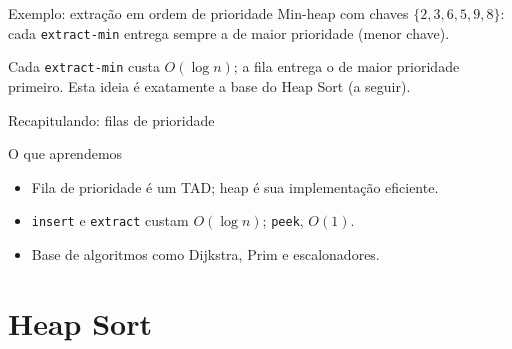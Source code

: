 \documentclass[aspectratio=169]{beamer}
\begin{document}
\begin{frame}{Exemplo: extração em ordem de prioridade}
  Min-heap com chaves $\{2,3,6,5,9,8\}$: cada \texttt{extract-min} entrega
  sempre a de maior prioridade (menor chave).
  \begin{center}
  \end{center}
  Cada \texttt{extract-min} custa $O(\log n)$; a fila entrega o de maior
  prioridade primeiro.
  \vfill
  {\footnotesize\color{UFSGray} Esta ideia é exatamente a base do Heap Sort
  (a seguir).}
\end{frame}

\begin{frame}{Recapitulando: filas de prioridade}
  \begin{block}{O que aprendemos}
    \begin{itemize}
      \item Fila de prioridade é um TAD; heap é sua implementação eficiente.
      \item \texttt{insert} e \texttt{extract} custam $O(\log n)$;
        \texttt{peek}, $O(1)$.
      \item Base de algoritmos como Dijkstra, Prim e escalonadores.
    \end{itemize}
  \end{block}
\end{frame}

\section{Heap Sort}
\end{document}
